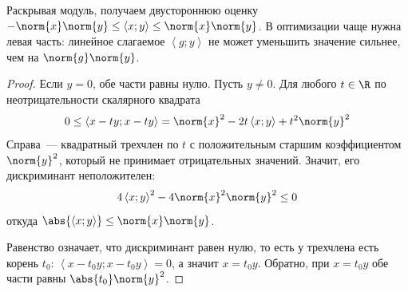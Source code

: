 

\begin{remark}
  Раскрывая модуль, получаем двустороннюю оценку $-\norm{x} \norm{y} \le \left\langle x; y \right\rangle \le \norm{x} \norm{y}$. В оптимизации чаще нужна левая часть: линейное слагаемое $\left\langle g; y \right\rangle$ не может уменьшить значение сильнее, чем на $\norm{g} \norm{y}$.
\end{remark}

\begin{proof}
  Если $y = 0$, обе части равны нулю. Пусть $y \ne 0$. Для любого $t \in \R$ по неотрицательности скалярного квадрата
  \[
  0 \le \left\langle x - ty; x - ty \right\rangle = \norm{x}^2 - 2t \left\langle x; y \right\rangle + t^2 \norm{y}^2
  \]
  Справа~--- квадратный трехчлен по $t$ с положительным старшим коэффициентом $\norm{y}^2$, который не принимает отрицательных значений. Значит, его дискриминант неположителен:
  \[
  4 \left\langle x; y \right\rangle^2 - 4 \norm{x}^2 \norm{y}^2 \le 0
  \]
  откуда $\abs{\left\langle x; y \right\rangle} \le \norm{x} \norm{y}$.

  Равенство означает, что дискриминант равен нулю, то есть у трехчлена есть корень $t_0$: $\left\langle x - t_0 y; x - t_0 y \right\rangle = 0$, а значит $x = t_0 y$.
  Обратно, при $x = t_0 y$ обе части равны $\abs{t_0} \norm{y}^2$.
\end{proof}
